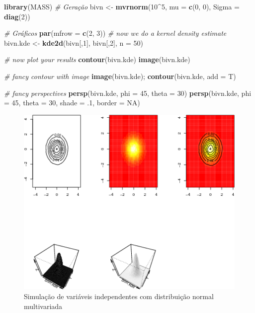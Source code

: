 \documentclass[a4paper]{article}
\newenvironment{Shaded}{\begin{snugshade}}{\end{snugshade}}
\newcommand{\KeywordTok}[1]{\textcolor[rgb]{0.13,0.29,0.53}{\textbf{#1}}}
\newcommand{\DataTypeTok}[1]{\textcolor[rgb]{0.13,0.29,0.53}{#1}}
\newcommand{\DecValTok}[1]{\textcolor[rgb]{0.00,0.00,0.81}{#1}}
\newcommand{\StringTok}[1]{\textcolor[rgb]{0.31,0.60,0.02}{#1}}
\newcommand{\CommentTok}[1]{\textcolor[rgb]{0.56,0.35,0.01}{\textit{#1}}}
\newcommand{\OtherTok}[1]{\textcolor[rgb]{0.56,0.35,0.01}{#1}}
\newcommand{\OperatorTok}[1]{\textcolor[rgb]{0.81,0.36,0.00}{\textbf{#1}}}
\newcommand{\NormalTok}[1]{#1}
\begin{document}
\begin{Shaded}
\begin{Highlighting}[]
\KeywordTok{library}\NormalTok{(MASS)}
\CommentTok{# Geração}
\NormalTok{bivn <-}\StringTok{ }\KeywordTok{mvrnorm}\NormalTok{(}\DecValTok{10}\OperatorTok{^}\DecValTok{5}\NormalTok{, }\DataTypeTok{mu =} \KeywordTok{c}\NormalTok{(}\DecValTok{0}\NormalTok{, }\DecValTok{0}\NormalTok{), }\DataTypeTok{Sigma =} \KeywordTok{diag}\NormalTok{(}\DecValTok{2}\NormalTok{))}

\CommentTok{# Gráficos}
\KeywordTok{par}\NormalTok{(}\DataTypeTok{mfrow =} \KeywordTok{c}\NormalTok{(}\DecValTok{2}\NormalTok{, }\DecValTok{3}\NormalTok{))}
\CommentTok{# now we do a kernel density estimate}
\NormalTok{bivn.kde <-}\StringTok{ }\KeywordTok{kde2d}\NormalTok{(bivn[,}\DecValTok{1}\NormalTok{], bivn[,}\DecValTok{2}\NormalTok{], }\DataTypeTok{n =} \DecValTok{50}\NormalTok{)}

\CommentTok{# now plot your results}
\KeywordTok{contour}\NormalTok{(bivn.kde)}
\KeywordTok{image}\NormalTok{(bivn.kde)}

\CommentTok{# fancy contour with image}
\KeywordTok{image}\NormalTok{(bivn.kde); }\KeywordTok{contour}\NormalTok{(bivn.kde, }\DataTypeTok{add =}\NormalTok{ T)}

\CommentTok{# fancy perspectives}
\KeywordTok{persp}\NormalTok{(bivn.kde, }\DataTypeTok{phi =} \DecValTok{45}\NormalTok{, }\DataTypeTok{theta =} \DecValTok{30}\NormalTok{)}
\KeywordTok{persp}\NormalTok{(bivn.kde, }\DataTypeTok{phi =} \DecValTok{45}\NormalTok{, }\DataTypeTok{theta =} \DecValTok{30}\NormalTok{, }\DataTypeTok{shade =}\NormalTok{ .}\DecValTok{1}\NormalTok{, }\DataTypeTok{border =} \OtherTok{NA}\NormalTok{)}
\end{Highlighting}
\end{Shaded}

\begin{figure}[H]

{\centering \includegraphics[width=0.7\linewidth]{images/mvrnorm-1} 

}

\caption{Simulação de variáveis independentes com distribuição normal multivariada}\label{fig:mvrnorm}
\end{figure}
\end{document}
